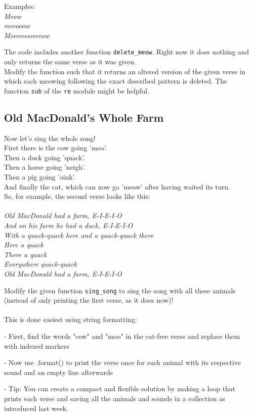 \noindent Examples:\\
\textit{Meow\\
meeooow\\
Meeeeeeeeeeeow\\}

\noindent The code includes another function  \texttt{delete\_meow}. Right now it does nothing and only returns the same verse as it was given.\\
Modify the function such that it returns an altered version of the given verse in which each meowing following the exact described pattern is deleted. The function \texttt{sub} of the \texttt{re} module might be helpful.

\cprotect{}

\subsection{Old MacDonald's Whole Farm}
Now let's sing the whole song!\\
First there is the cow going 'moo'.\\
Then a duck going 'quack'.\\
Then a horse going 'neigh'.\\
Then a pig going 'oink'.\\
And finally the cat, which can now go 'meow' after having waited its turn.\\
So, for example, the second verse looks like this:\\\\
\textit{
Old MacDonald had a farm, E-I-E-I-O\\
And on his farm he had a duck, E-I-E-I-O\\
With a quack-quack here and a quack-quack there\\
Here a quack\\
There a quack\\
Everywhere quack-quack\\
Old MacDonald had a farm, E-I-E-I-O\\
}

\noindent Modify the given function  \texttt{sing\_song} to sing the song with all these animals (instead of only printing the first verse, as it does now)!\\\\
This is done easiest using string formatting:\\
\begin{description}
  \item - First, find the words "cow" and "moo" in the cat-free verse and replace them with indexed markers
  \item - Now use .format() to print the verse once for each animal with its respective sound and an empty line afterwards
  \item - Tip: You can create a compact and flexible solution by making a loop that prints each verse and saving all the animals and sounds in a collection as introduced last week.
\end{description}

